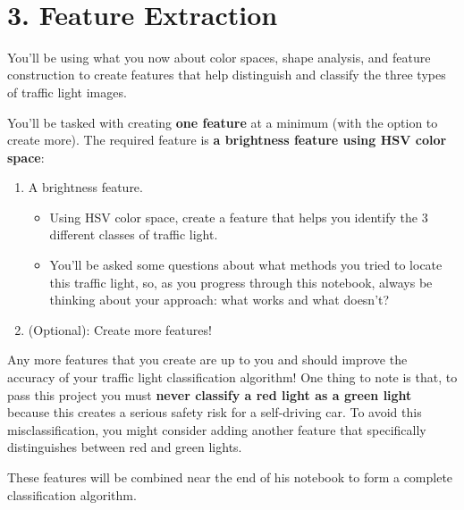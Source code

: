 \documentclass[11pt]{article}
\providecommand{\tightlist}{%
      \setlength{\itemsep}{0pt}\setlength{\parskip}{0pt}}
\begin{document}
    \begin{center}
    \end{center}
    { \hspace*{\fill} \\}
    
    \hypertarget{feature-extraction}{%
\section{3. Feature Extraction}\label{feature-extraction}}

You'll be using what you now about color spaces, shape analysis, and
feature construction to create features that help distinguish and
classify the three types of traffic light images.

You'll be tasked with creating \textbf{one feature} at a minimum (with
the option to create more). The required feature is \textbf{a brightness
feature using HSV color space}:

\begin{enumerate}
\def\labelenumi{\arabic{enumi}.}
\tightlist
\item
  A brightness feature.

  \begin{itemize}
  \tightlist
  \item
    Using HSV color space, create a feature that helps you identify the
    3 different classes of traffic light.
  \item
    You'll be asked some questions about what methods you tried to
    locate this traffic light, so, as you progress through this
    notebook, always be thinking about your approach: what works and
    what doesn't?
  \end{itemize}
\item
  (Optional): Create more features!
\end{enumerate}

Any more features that you create are up to you and should improve the
accuracy of your traffic light classification algorithm! One thing to
note is that, to pass this project you must \textbf{never classify a red
light as a green light} because this creates a serious safety risk for a
self-driving car. To avoid this misclassification, you might consider
adding another feature that specifically distinguishes between red and
green lights.

These features will be combined near the end of his notebook to form a
complete classification algorithm.
\end{document}
